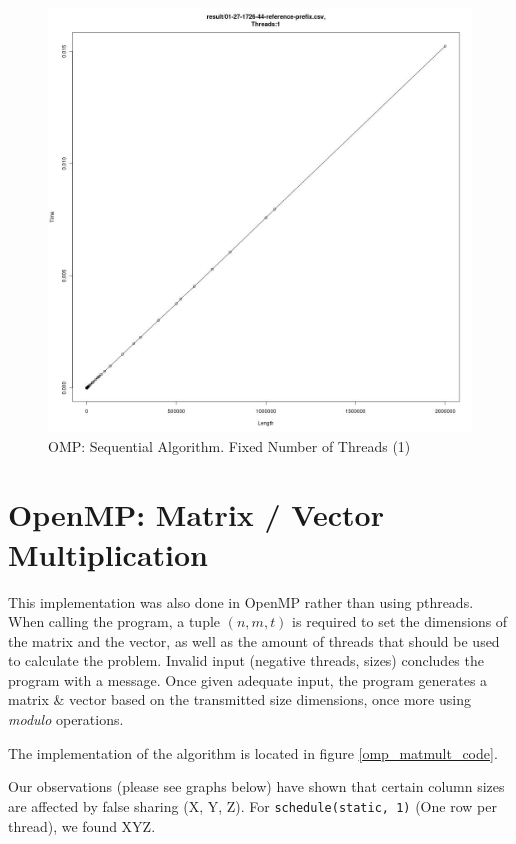 \documentclass[11pt]{article}
\begin{document}
\begin{figure}[H]
\centering
\caption{OMP: Sequential Algorithm. Fixed Number of Threads (1)}

\includegraphics[scale=0.4]{candidate-graphs/omp_p1_length_time_1_XYZ.jpg}
\end{figure}

\newpage
\section{OpenMP: Matrix / Vector Multiplication}
This implementation was also done in OpenMP rather than using pthreads. When calling the program, a tuple $(n, m, t)$ is required to set the dimensions of the matrix and the vector, as well as the amount of threads that should be used to calculate the problem. Invalid input (negative threads, sizes) concludes the program with a message.
Once given adequate input, the program generates a matrix \& vector based on the transmitted size dimensions, once more using \emph{modulo} operations.

The implementation of the algorithm is located in figure \ref{omp_matmult_code}.

Our observations (please see graphs below) have shown that certain column sizes are affected by false sharing (X, Y, Z). For \verb=schedule(static, 1)= (One row per thread), we found XYZ.
\end{document}
